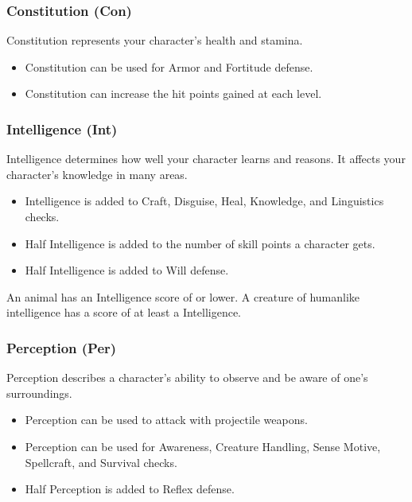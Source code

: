 \subsubsection{Constitution (Con)}
Constitution represents your character's health and stamina.
\begin{itemize}
    \item Constitution can be used for Armor and Fortitude defense.
    \item Constitution can increase the hit points gained at each level.
\end{itemize}

\subsubsection{Intelligence (Int)}
Intelligence determines how well your character learns and reasons. It affects your character's knowledge in many areas.

\begin{itemize}
    \item Intelligence is added to Craft, Disguise, Heal, Knowledge, and Linguistics checks.
    \item Half Intelligence is added to the number of skill points a character gets.
    \item Half Intelligence is added to Will defense.
\end{itemize}

\par An animal has an Intelligence score of  or lower. A creature of humanlike intelligence has a score of at least a  Intelligence.

\subsubsection{Perception (Per)}
Perception describes a character's ability to observe and be aware of one's surroundings.
\begin{itemize}
    \item Perception can be used to attack with projectile weapons.
    \item Perception can be used for Awareness, Creature Handling, Sense Motive, Spellcraft, and Survival checks.
    \item Half Perception is added to Reflex defense.
\end{itemize}

